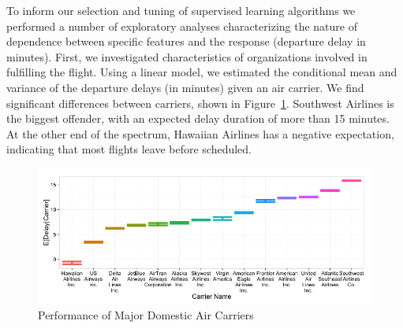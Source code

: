 \documentclass[twocolumn]{article}
\begin{document}
To inform our selection and tuning of supervised learning algorithms we performed a number of exploratory analyses characterizing the nature of dependence between specific features and the response (departure delay in minutes). First, we investigated characteristics of organizations involved in fulfilling the flight. Using a linear model, we estimated the conditional mean and variance of the departure delays (in minutes) given an air carrier. We find significant differences between carriers, shown in Figure~\ref{fig:carrier-performance}. Southwest Airlines is the biggest offender, with an expected delay duration of more than 15 minutes. At the other end of the spectrum, Hawaiian Airlines has a negative expectation, indicating that most flights leave before scheduled.

\begin{figure}
    \centering
    \includegraphics[width=\linewidth]{figures/carrier-performance.png}
    \caption{Performance of Major Domestic Air Carriers}
    \label{fig:carrier-performance}
\end{figure}
\end{document}
